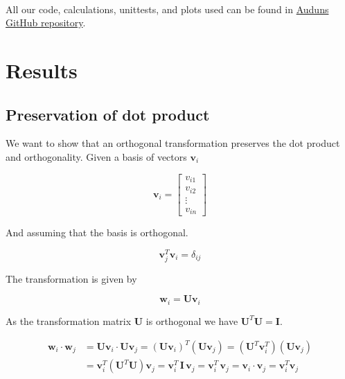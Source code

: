 \documentclass[a4paper, fontsize=11pt]{article}
\begin{document}
\paragraph{}
All our code, calculations, unittests, and plots used can be found in \href{https://github.com/auduntre/FYS4150/tree/master/Project%202}{Auduns GitHub repository}.

\section{Results}
\subsection{Preservation of dot product}
We want to show that an orthogonal transformation preserves the dot product and orthogonality. Given a basis of vectors $\textbf{v}_{i}$

\begin{equation}
\textbf{v}_{i}=
\begin{bmatrix}
v_{i1} \\
v_{i2} \\
\vdots \\
v_{in}
\end{bmatrix}
\end{equation}

And assuming that the basis is orthogonal.

\begin{equation}
\textbf{v}^{T}_{j} \textbf{v}_{i} = \delta_{ij}
\end{equation}

The transformation is given by

\begin{equation}
\textbf{w}_{i} = \textbf{U} \textbf{v}_{i}
\end{equation}

As the transformation matrix \textbf{U} is orthogonal we have $\textbf{U}^{T}\textbf{U} = \textbf{I}$.

\begin{align*}
\textbf{w}_{i} \cdot \textbf{w}_{j} & =\textbf{U} \textbf{v}_{i} \cdot \textbf{U} \textbf{v}_{j} = (\textbf{U}\textbf{v}_{i})^{T}(\textbf{U}\textbf{v}_{j})=(\textbf{U}^{T} \textbf{v}_{i}^{T})(\textbf{U}\textbf{v}_{j})\\
&= \textbf{v}_{i}^{T} (\textbf{U}^{T} \textbf{U}) \textbf{v}_{j}= \textbf{v}_{i}^{T} \, \textbf{I} \, \textbf{v}_{j} =  \textbf{v}_{i}^{T} \,  \textbf{v}_{j} = \textbf{v}_{i} \cdot \textbf{v}_{j} = \textbf{v}^T_{i} \textbf{v}_{j}
\end{align*}
\end{document}
